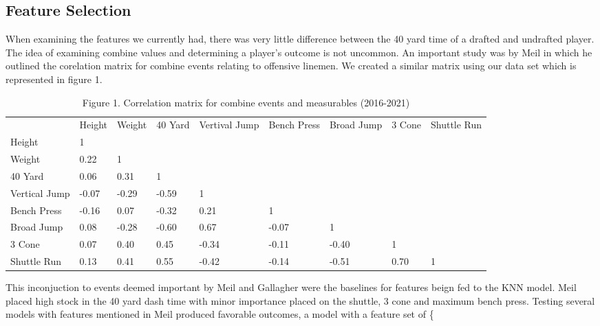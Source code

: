 \documentclass[confrence]{IEEEtran}
\begin{document}
\subsection*{Feature Selection}
When examining the features we currently had, there was very little difference between the 40 yard time of a drafted and undrafted player. 
The idea of examining combine values and determining a player's outcome is not uncommon. 
An important study was by Meil in which he outlined the corelation matrix for combine events relating to offensive linemen.
We created a similar matrix using our data set which is represented in figure 1. 
\begin{table*}[t]
\begin{tabular}{lllllllll}
              & Height & Weight & 40 Yard & Vertival Jump & Bench Press & Broad Jump & 3 Cone & Shuttle Run \\
Height        & 1      &        &         &               &             &            &        &             \\
Weight        & 0.22   & 1      &         &               &             &            &        &             \\
40 Yard       & 0.06   & 0.31   & 1       &               &             &            &        &             \\
Vertical Jump & -0.07  & -0.29  & -0.59   & 1             &             &            &        &             \\
Bench Press   & -0.16  & 0.07   & -0.32   & 0.21          & 1           &            &        &             \\
Broad Jump    & 0.08   & -0.28  & -0.60   & 0.67          & -0.07       & 1          &        &             \\
3 Cone        & 0.07   & 0.40   & 0.45    & -0.34         & -0.11       & -0.40      & 1      &             \\
Shuttle Run   & 0.13   & 0.41   & 0.55    & -0.42         & -0.14       & -0.51      & 0.70   & 1          
\end{tabular}
\caption*{Figure 1. Correlation matrix for combine events and measurables (2016-2021)}
\end{table*}
This inconjuction to events deemed important by Meil and Gallagher were the baselines for features beign fed to the KNN model. 
Meil placed high stock in the 40 yard dash time with minor importance placed on the shuttle, 3 cone and maximum bench press. 
Testing several models with features mentioned in Meil produced favorable outcomes, a model with a feature set of  \{
\end{document}
